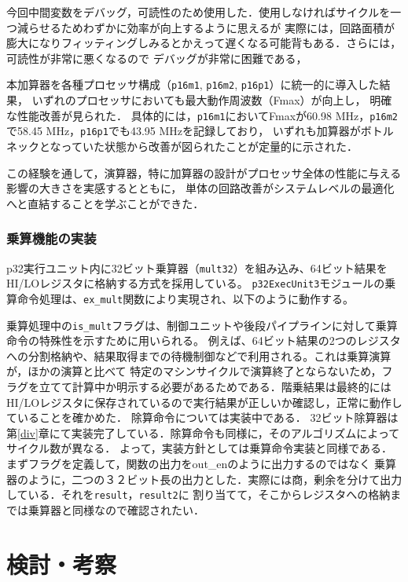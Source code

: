 \documentclass[autodetect-engine,dvi=dvipdfmx,ja=standard,
               a4j,11pt]{bxjsarticle}
\begin{document}
今回中間変数をデバッグ，可読性のため使用した．使用しなければサイクルを一つ減らせるためわずかに効率が向上するように思えるが
実際には，回路面積が膨大になりフィッティングしみるとかえって遅くなる可能背もある．さらには，可読性が非常に悪くなるので
デバッグが非常に困難である，

本加算器を各種プロセッサ構成（\texttt{p16m1}, \texttt{p16m2}, \texttt{p16p1}）に統一的に導入した結果，
いずれのプロセッサにおいても最大動作周波数（Fmax）が向上し，
明確な性能改善が見られた．
具体的には，\texttt{p16m1}においてFmaxが60.98 MHz，\texttt{p16m2}で58.45 MHz，\texttt{p16p1}でも43.95 MHzを記録しており，
いずれも加算器がボトルネックとなっていた状態から改善が図られたことが定量的に示された．

この経験を通して，演算器，特に加算器の設計がプロセッサ全体の性能に与える影響の大きさを実感するとともに，
単体の回路改善がシステムレベルの最適化へと直結することを学ぶことができた．
\subsubsection{乗算機能の実装}
p32実行ユニット内に32ビット乗算器（\texttt{mult32}）を組み込み、64ビット結果をHI/LOレジスタに格納する方式を採用している。  
\texttt{p32ExecUnit3}モジュールの乗算命令処理は、\texttt{ex\_mult}関数により実現され、以下のように動作する。


乗算処理中の\texttt{is\_mult}フラグは、制御ユニットや後段パイプラインに対して乗算命令の特殊性を示すために用いられる。
例えば、64ビット結果の2つのレジスタへの分割格納や、結果取得までの待機制御などで利用される。これは乗算演算が，ほかの演算と比べて
特定のマシンサイクルで演算終了とならないため，フラグを立てて計算中か明示する必要があるためである．階乗結果は最終的には
HI/LOレジスタに保存されているので実行結果が正しいか確認し，正常に動作していることを確かめた．
除算命令については実装中である．
32ビット除算器は第\ref{div}章にて実装完了している．除算命令も同様に，そのアルゴリズムによってサイクル数が異なる．
よって，実装方針としては乗算命令実装と同様である．まずフラグを定義して，関数の出力をout\_enのように出力するのではなく
乗算器のように，二つの３２ビット長の出力とした．実際には商，剰余を分けて出力している．それを\verb|result|，\verb|result2|に
割り当てて，そこからレジスタへの格納までは乗算器と同様なので確認されたい．

\section{検討・考察}
\end{document}

